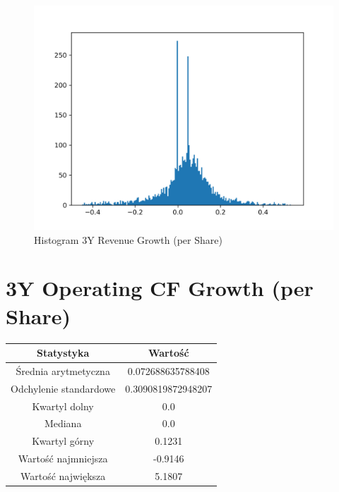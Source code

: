 \documentclass{article}
\begin{document}
\begin{figure}[h!]
    \includegraphics[width=\linewidth]{variables/3Y Revenue Growth (per Share).png}
    \caption{Histogram 3Y Revenue Growth (per Share) }
\end{figure}\section{ 3Y Operating CF Growth (per Share) }

\begin{center}
    \begin{tabular}{|c | c|} 
    \hline
    Statystyka & Wartość \\
    \hline\hline
    Średnia arytmetyczna & 0.072688635788408 \\ 
    \hline
    Odchylenie standardowe & 0.3090819872948207 \\
    \hline
    Kwartyl dolny & 0.0 \\
    \hline
    Mediana & 0.0 \\
    \hline
    Kwartyl górny & 0.1231 \\
    \hline
    Wartość najmniejsza & -0.9146 \\
    \hline
    Wartość największa & 5.1807 \\
    \hline
   \end{tabular}
\end{center}
\end{document}
